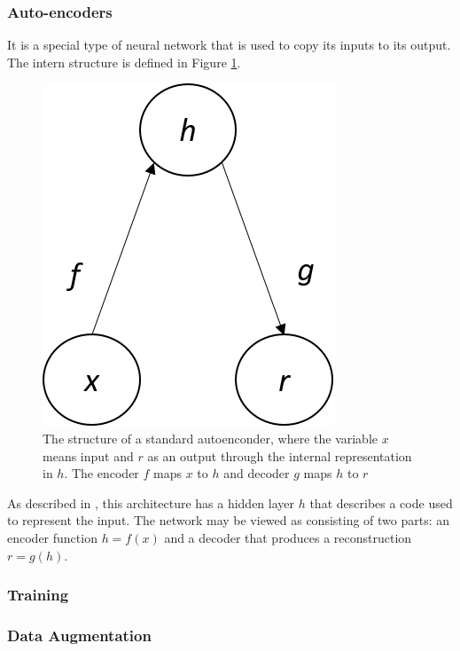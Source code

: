 \subsubsection{Auto-encoders}\label{auto-encoder}

It is a special type of neural network that is used to copy its inputs to its output. The intern structure is defined in Figure \ref{fig:autoencoder}. 

\begin{figure}[H]
\centering
\includegraphics[scale=0.7]{imagens/autoencoder.png}
\caption{The structure of a standard autoenconder, where the variable $x$ means input and $r$ as an output through the internal representation in $h$. The encoder $f$ maps $x$ to $h$ and decoder $g$ maps $h$ to $r$}
\label{fig:autoencoder}
\end{figure}

As described in \cite{yang2020feedback}, this architecture has a hidden layer $h$ that describes a code used to represent the input. The network may be viewed as consisting of two parts: an encoder function $h=f(x)$ and a decoder that produces a reconstruction $r=g(h)$.

\subsubsection{Training}

\subsubsection{Data Augmentation}



